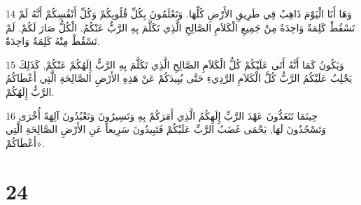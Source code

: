 \par 14 وَهَا أَنَا الْيَوْمَ ذَاهِبٌ فِي طَرِيقِ الأَرْضِ كُلِّهَا. وَتَعْلَمُونَ بِكُلِّ قُلُوبِكُمْ وَكُلِّ أَنْفُسِكُمْ أَنَّهُ لَمْ تَسْقُطْ كَلِمَةٌ وَاحِدَةٌ مِنْ جَمِيعِ الْكَلاَمِ الصَّالِحِ الَّذِي تَكَلَّمَ بِهِ الرَّبُّ عَنْكُمُ. الْكُلُّ صَارَ لَكُمْ. لَمْ تَسْقُطْ مِنْهُ كَلِمَةٌ وَاحِدَةٌ.
\par 15 وَيَكُونُ كَمَا أَنَّهُ أَتَى عَلَيْكُمْ كُلُّ الْكَلاَمِ الصَّالِحِ الَّذِي تَكَلَّمَ بِهِ الرَّبُّ إِلَهُكُمْ عَنْكُمْ, كَذَلِكَ يَجْلِبُ عَلَيْكُمُ الرَّبُّ كُلَّ الْكَلاَمِ الرَّدِيءِ حَتَّى يُبِيدَكُمْ عَنْ هَذِهِ الأَرْضِ الصَّالِحَةِ الَّتِي أَعْطَاكُمُ الرَّبُّ إِلَهُكُمْ.
\par 16 حِينَمَا تَتَعَدُّونَ عَهْدَ الرَّبِّ إِلَهِكُمُ الَّذِي أَمَرَكُمْ بِهِ وَتَسِيرُونَ وَتَعْبُدُونَ آلِهَةً أُخْرَى وَتَسْجُدُونَ لَهَا, يَحْمَى غَضَبُ الرَّبِّ عَلَيْكُمْ فَتَبِيدُونَ سَرِيعاً عَنِ الأَرْضِ الصَّالِحَةِ الَّتِي أَعْطَاكُمْ».

\chapter{24}

